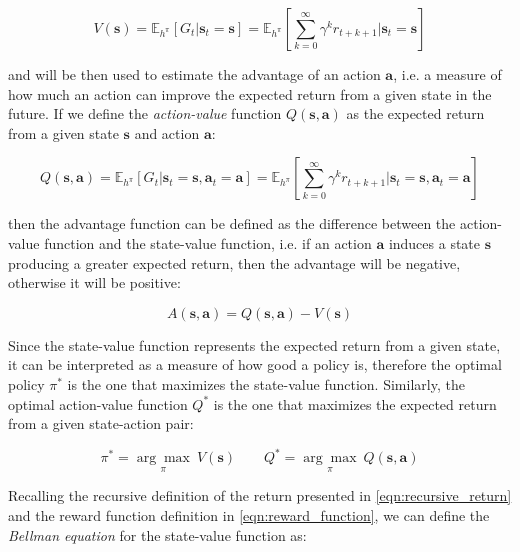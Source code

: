 \begin{equation}
    V(\mathbf{s}) = \mathbb{E} _{h^{\pi}} \left[ G _t | \mathbf{s} _t = \mathbf{s} \right] = \mathbb{E} _{h^{\pi}} \left[ \sum ^{\infty} _{k = 0} \gamma ^k r _{t+k+1} | \mathbf{s} _t = \mathbf{s} \right]
\end{equation}

and will be then used to estimate the advantage of an action $\mathbf{a}$, i.e. a measure of how much an action can improve the expected return from a given state in the future.
If we define the \textit{action-value} function $Q(\mathbf{s}, \mathbf{a})$ as the expected return from a given state $\mathbf{s}$ and action $\mathbf{a}$:

\begin{equation}
    Q (\mathbf{s}, \mathbf{a}) = \mathbb{E} _{h^{\pi}} \left[ G _t | \mathbf{s} _t = \mathbf{s}, \mathbf{a} _t = \mathbf{a} \right] = \mathbb{E} _{h^{\pi}} \left[ \sum ^{\infty} _{k = 0} \gamma ^k r _{t+k+1} | \mathbf{s} _t = \mathbf{s}, \mathbf{a} _t = \mathbf{a} \right]
\end{equation}

then the advantage function can be defined as the difference between the action-value function and the state-value function, i.e. if an action $\mathbf{a}$ induces a state $\mathbf{s}$ producing a greater expected return, then the advantage will be negative, otherwise it will be positive:

\begin{equation}
    A (\mathbf{s}, \mathbf{a}) = Q (\mathbf{s}, \mathbf{a}) - V (\mathbf{s})
\end{equation}

Since the state-value function represents the expected return from a given state, it can be interpreted as a measure of how good a policy is, therefore the optimal policy $\pi ^*$ is the one that maximizes the state-value function. Similarly, the optimal action-value function $Q ^*$ is the one that maximizes the expected return from a given state-action pair:

\begin{equation}
    \pi ^* = \underset{\pi}{\arg\max} \ V (\mathbf{s}) \qquad Q ^* = \underset{\pi}{\arg\max} \ Q (\mathbf{s}, \mathbf{a})
\end{equation}

Recalling the recursive definition of the return presented in \cref{eqn:recursive_return} and the reward function definition in \cref{eqn:reward_function}, we can define the \textit{Bellman equation} \citep{bellman_dynamic_2003} for the state-value function as:

